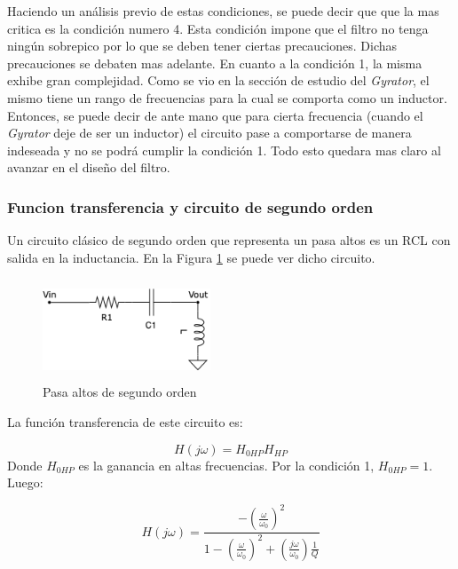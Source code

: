 Haciendo un análisis previo de estas condiciones, se puede decir que que la mas critica es la condición numero 4. Esta condición impone que el filtro no tenga ningún sobrepico por lo que se deben tener ciertas precauciones. Dichas precauciones se debaten mas adelante. En cuanto a la condición 1, la misma exhibe gran complejidad. Como se vio en la sección de estudio del \textit{Gyrator}, el mismo tiene un rango de frecuencias para la cual se comporta como un inductor. Entonces, se puede decir de ante mano que para cierta frecuencia (cuando el \textit{Gyrator} deje de ser un inductor) el circuito pase a comportarse de manera indeseada y no se podrá cumplir la condición 1. Todo esto quedara mas claro al avanzar en el diseño del filtro. 

\subsubsection{Funcion transferencia y circuito de segundo orden}

Un circuito clásico de segundo orden que representa un pasa altos es un RCL con salida en la inductancia. En la Figura \ref{ej2_filto_HP} se puede ver dicho circuito. 
\begin{figure}[h!]                                                       
    \centering\includegraphics[width=5cm, height=3cm]{../Ex2/Resources/ej2_hp.png}
    \caption{Pasa altos de segundo orden}
    \label{ej2_filto_HP}
    \end{figure}


La función transferencia de este circuito es:

\begin{displaymath} H(j\omega)= H_{0HP} H_{HP} \end{displaymath}  
Donde $H_{0HP}$ es la ganancia en altas frecuencias. Por la condición 1, $H_{0HP} = 1$. Luego:   

\begin{equation} H(j\omega) = \frac{-(\frac{\omega}{\omega_0})^{2}}{1 - (\frac{\omega}{\omega_0})^{2} + (\frac{j\omega}{\omega_0})\frac{1}{Q}} \label{equ:trans_clasica_hp}\end{equation}  

